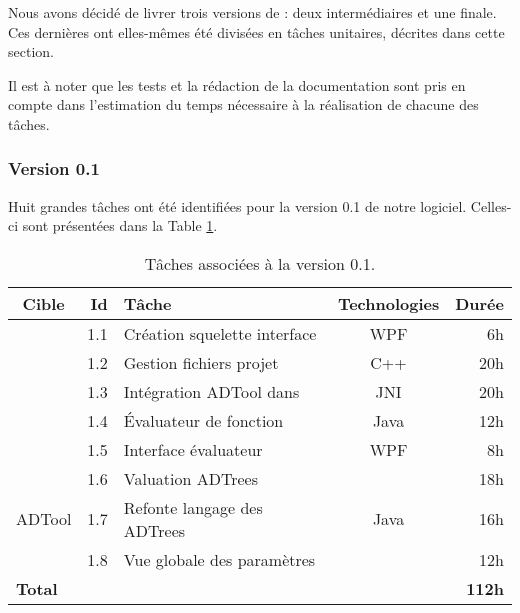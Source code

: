 	Nous avons décidé de livrer trois versions de \glasir{} : deux intermédiaires et une finale. Ces dernières ont elles-mêmes été divisées en tâches unitaires, décrites dans cette section. 
	
	Il est à noter que les tests et la rédaction de la documentation sont pris en compte dans l'estimation du temps nécessaire à la réalisation de chacune des tâches.
	

	\subsubsection{Version 0.1}
		Huit grandes tâches ont été identifiées pour la version 0.1 de notre logiciel. Celles-ci sont présentées dans la {\sc Table} \ref{tab:taches_units_1}. 
		\begin{table}[H]
			\centering
			\begin{tabular}{|c|r|l|c|r|}
				\hline
				\textbf{Cible} & \textbf{Id} & \textbf{Tâche} & \textbf{Technologies} & \textbf{Durée}\\
				\hline

				\multirow{5}{*}{\glasir{}} & 1.1 & Création squelette interface & WPF & 6h\\
				\cline{2-5}
				 & 1.2 & Gestion fichiers projet & C++ & 20h\\
				\cline{2-5}
				 & 1.3 & Intégration ADTool dans \glasir & JNI & 20h\\
				\cline{2-5}
				 & 1.4 & \'Evaluateur de fonction & Java & 12h\\
				\cline{2-5}
				 & 1.5 & Interface évaluateur & WPF & 8h\\
				\hline

				\multirow{3}{*}{ADTool} & 1.6 & Valuation ADTrees & \multirow{3}{*}{Java} & 18h\\
				\cline{2-3} \cline{5-5}
				 & 1.7 & Refonte langage des ADTrees & & 16h\\
				\cline{2-3} \cline{5-5}
				 & 1.8 & Vue globale des paramètres & & 12h\\
				\hline

				\multicolumn{4}{|l|}{\bf Total} & {\bf 112h}\\
				\hline
			\end{tabular}
			\caption{Tâches associées à la version 0.1.}
			\label{tab:taches_units_1}
		\end{table}
		
